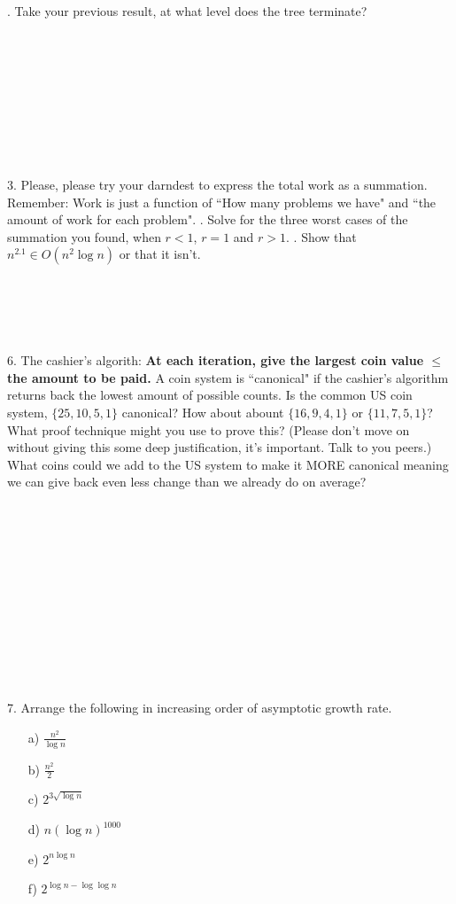 \documentclass[12pt]{article}
\begin{document}
\newpage
{}. Take your previous result, at what level does the tree terminate?\\\\\\\\\\\\\\\\\\\\
3. Please, please try your darndest to express the total work as a summation. Remember: Work is just a function of ``How many problems we have" and ``the amount of work for each problem".
\newpage
{}. Solve for the three worst cases of the summation you found, when $r<1$, $r=1$ and $r>1$. 
\newpage
{}. Show that $n^{2.1} \in O(n^2\log{n})$ or that it isn't.\\\\\\\\\\\\
6. The cashier's algorith: \textbf{At each iteration, give the largest coin value $\leq$ the amount to be paid.} A coin system is ``canonical" if the cashier's algorithm returns back the lowest amount of possible counts. Is the common US coin system, $\{25,10,5,1\}$ canonical? How about abount $\{16,9,4,1\}$ or $\{11,7,5,1\}$? What proof technique might you use to prove this? (Please don't move on without giving this some deep justification, it's important. Talk to you peers.) What coins could we add to the US system to make it MORE canonical meaning we can give back even less change than we already do on average?\\\\\\\\\\\\\\\\\\\\\\\\\\
7. Arrange the following in increasing order of asymptotic growth rate.
\begin{enumerate}
    \item[a)]$\frac{n^2}{\log{n}}$
    \item[b)]$\frac{n^2}{2}$
    \item[c)]$2^{3\sqrt{\log{n}}}$
    \item[d)]$n(\log{n})^{1000}$
    \item[e)]$2^{n\log{n}}$
    \item[f)]$2^{\log{n}-\log{\log{n}}}$ 
\end{enumerate}
\end{document}
